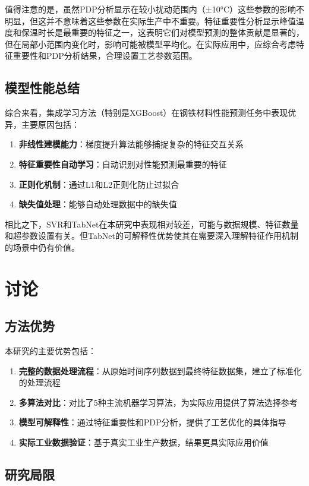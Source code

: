 \documentclass[12pt,a4paper]{article}
\begin{document}
值得注意的是，虽然PDP分析显示在较小扰动范围内（±10°C）这些参数的影响不明显，但这并不意味着这些参数在实际生产中不重要。特征重要性分析显示峰值温度和保温时长是最重要的特征之一，这表明它们对模型预测的整体贡献是显著的，但在局部小范围内变化时，影响可能被模型平均化。在实际应用中，应综合考虑特征重要性和PDP分析结果，合理设置工艺参数范围。

\subsection{模型性能总结}

综合来看，集成学习方法（特别是XGBoost）在钢铁材料性能预测任务中表现优异，主要原因包括：
\begin{enumerate}
\item \textbf{非线性建模能力}：梯度提升算法能够捕捉复杂的特征交互关系
\item \textbf{特征重要性自动学习}：自动识别对性能预测最重要的特征
\item \textbf{正则化机制}：通过L1和L2正则化防止过拟合
\item \textbf{缺失值处理}：能够自动处理数据中的缺失值
\end{enumerate}

相比之下，SVR和TabNet在本研究中表现相对较差，可能与数据规模、特征数量和超参数设置有关。但TabNet的可解释性优势使其在需要深入理解特征作用机制的场景中仍有价值。

\section{讨论}

\subsection{方法优势}

本研究的主要优势包括：
\begin{enumerate}
\item \textbf{完整的数据处理流程}：从原始时间序列数据到最终特征数据集，建立了标准化的处理流程
\item \textbf{多算法对比}：对比了5种主流机器学习算法，为实际应用提供了算法选择参考
\item \textbf{模型可解释性}：通过特征重要性和PDP分析，提供了工艺优化的具体指导
\item \textbf{实际工业数据验证}：基于真实工业生产数据，结果更具实际应用价值
\end{enumerate}

\subsection{研究局限}
\end{document}
